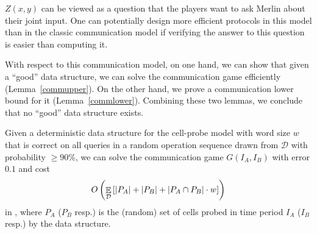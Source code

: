 \documentclass[11pt]{article}
\begin{document}
$Z(x, y)$ can be viewed as a question that the players want to ask Merlin about their joint input. One can potentially design more efficient protocols in this model than in the classic communication model if verifying the answer to this question is easier than computing it. 

With respect to this communication model, on one hand, we can show that given a ``good'' \bps{} data structure, we can solve the communication game efficiently (Lemma~\ref{commupper}). On the other hand, we prove a communication lower bound for it (Lemma~\ref{commlower}). Combining these two lemmas, we conclude that no ``good'' data structure exists. 

\begin{lemma}\label{commupper}
Given a deterministic \bps{} data structure for the cell-probe model with word size $w$ that is correct on all queries in a random operation sequence drawn from $\mathcal{D}$ with probability $\geq 90\%$, we can solve the communication game $G(I_A,I_B)$ with error $0.1$ and cost \[
O\left(\mathop{\mathbb{E}}_{\mathcal{D}}\left[|P_A|+|P_B|+|P_A\cap P_B|\cdot w\right]\right)\] in \mm{}, where $P_A$ ($P_B$ resp.) is the (random) set of cells probed in time period $I_A$ ($I_B$ resp.) by the data structure. 
\end{lemma}
\end{document}
